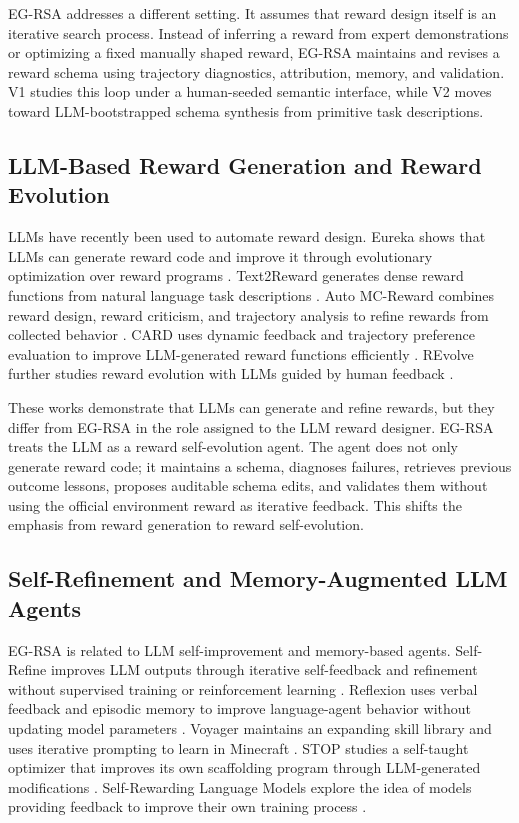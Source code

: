\documentclass[11pt]{article}
\begin{document}
EG-RSA addresses a different setting. It assumes that reward design itself is an iterative search process. Instead of inferring a reward from expert demonstrations or optimizing a fixed manually shaped reward, EG-RSA maintains and revises a reward schema using trajectory diagnostics, attribution, memory, and validation. V1 studies this loop under a human-seeded semantic interface, while V2 moves toward LLM-bootstrapped schema synthesis from primitive task descriptions.

\subsection{LLM-Based Reward Generation and Reward Evolution}

LLMs have recently been used to automate reward design. Eureka shows that LLMs can generate reward code and improve it through evolutionary optimization over reward programs \citep{ma2023eureka}. Text2Reward generates dense reward functions from natural language task descriptions \citep{xie2023text2reward}. Auto MC-Reward combines reward design, reward criticism, and trajectory analysis to refine rewards from collected behavior \citep{li2023automcreward}. CARD uses dynamic feedback and trajectory preference evaluation to improve LLM-generated reward functions efficiently \citep{sun2024card}. REvolve further studies reward evolution with LLMs guided by human feedback \citep{hazra2024revolve}.

These works demonstrate that LLMs can generate and refine rewards, but they differ from EG-RSA in the role assigned to the LLM reward designer. EG-RSA treats the LLM as a reward self-evolution agent. The agent does not only generate reward code; it maintains a schema, diagnoses failures, retrieves previous outcome lessons, proposes auditable schema edits, and validates them without using the official environment reward as iterative feedback. This shifts the emphasis from reward generation to reward self-evolution.

\subsection{Self-Refinement and Memory-Augmented LLM Agents}

EG-RSA is related to LLM self-improvement and memory-based agents. Self-Refine improves LLM outputs through iterative self-feedback and refinement without supervised training or reinforcement learning \citep{madaan2023selfrefine}. Reflexion uses verbal feedback and episodic memory to improve language-agent behavior without updating model parameters \citep{shinn2023reflexion}. Voyager maintains an expanding skill library and uses iterative prompting to learn in Minecraft \citep{wang2023voyager}. STOP studies a self-taught optimizer that improves its own scaffolding program through LLM-generated modifications \citep{zelikman2023stop}. Self-Rewarding Language Models explore the idea of models providing feedback to improve their own training process \citep{yuan2024selfrewarding}.
\end{document}
